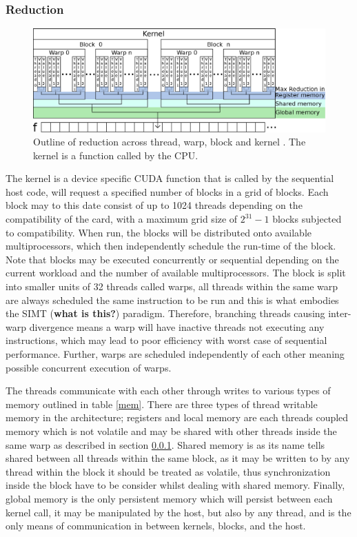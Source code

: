 \documentclass{llncs}
\begin{document}
\subsubsection{Reduction} \label{reduction} %
\begin{figure}
\centering
\includegraphics[width=\linewidth]{reduction}
\caption{Outline of reduction across thread, warp, block and kernel \label{fig:reduction}. The kernel is a function called by the CPU.}
\end{figure}
The kernel is a device specific CUDA function that is called by the sequential host code, will request a specified number of blocks in a grid of blocks. Each block may to this date consist of up to 1024 threads depending on the compatibility of the card, with a maximum grid size of $2^{31}-1$ blocks subjected to compatibility. When run, the blocks will be distributed onto available multiprocessors, which then independently schedule the run-time of the block. Note that blocks may be executed concurrently or sequential depending on the current workload and the number of available multiprocessors. The block is split into smaller units of 32 threads called warps, all threads within the same warp are always scheduled the same instruction to be run and this is what embodies the SIMT (\textbf{what is this?}) paradigm.  Therefore, branching threads causing inter-warp divergence means a warp will have inactive threads not executing any instructions,  which may lead to poor efficiency with worst case of sequential performance. Further, warps are scheduled independently of each other meaning possible concurrent execution of warps.

The threads communicate with each other through writes to various types of memory outlined in table \ref{mem}. There are three types of thread writable memory in the architecture; registers and local memory are each threads coupled memory which is not volatile and may be shared with other threads inside the same warp as described in section \ref{reduction}.  Shared memory is as its name tells shared between all threads within the same block, as it may be written to by any thread within the block it should be treated as volatile, thus synchronization inside the block have to be consider whilst dealing with shared memory. Finally, global memory is the only persistent memory which will persist between each kernel call, it may be manipulated by the host, but also by any thread, and is the only means of communication in between kernels, blocks, and the host.
\end{document}
